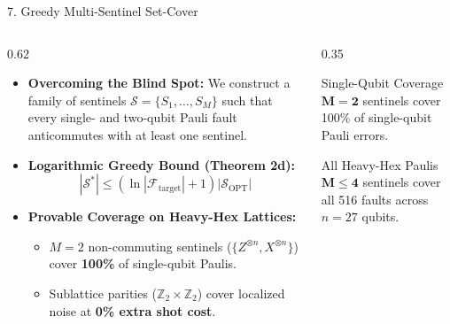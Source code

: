 \documentclass[aspectratio=169, 10pt]{beamer}
\begin{document}
\begin{frame}{7. Greedy Multi-Sentinel Set-Cover}
    \begin{columns}[T]
        \begin{column}{0.62\textwidth}
            \begin{itemize}
                \item \textbf{Overcoming the Blind Spot:} We construct a family of sentinels $\mathcal{S} = \{S_1, \dots, S_M\}$ such that every single- and two-qubit Pauli fault anticommutes with at least one sentinel.
                \item \textbf{Logarithmic Greedy Bound (Theorem 2d):}
                $$|\mathcal{S}^*| \le \left(\ln |\mathcal{F}_{\mathrm{target}}| + 1\right) |\mathcal{S}_{\mathrm{OPT}}|$$
                \item \textbf{Provable Coverage on Heavy-Hex Lattices:}
                \begin{itemize}
                    \item $M=2$ non-commuting sentinels ($\{Z^{\otimes n}, X^{\otimes n}\}$) cover \textbf{100\%} of single-qubit Paulis.
                    \item Sublattice parities ($\mathbb{Z}_2 \times \mathbb{Z}_2$) cover localized noise at \textbf{0\% extra shot cost}.
                \end{itemize}
            \end{itemize}
        \end{column}
        \begin{column}{0.35\textwidth}
            \begin{exampleblock}{Single-Qubit Coverage}
                $\mathbf{M=2}$ sentinels cover 100\% of single-qubit Pauli errors.
            \end{exampleblock}
            \vspace{0.3cm}
            \begin{exampleblock}{All Heavy-Hex Paulis}
                $\mathbf{M \le 4}$ sentinels cover all 516 faults across $n=27$ qubits.
            \end{exampleblock}
        \end{column}
    \end{columns}
\end{frame}
\end{document}

